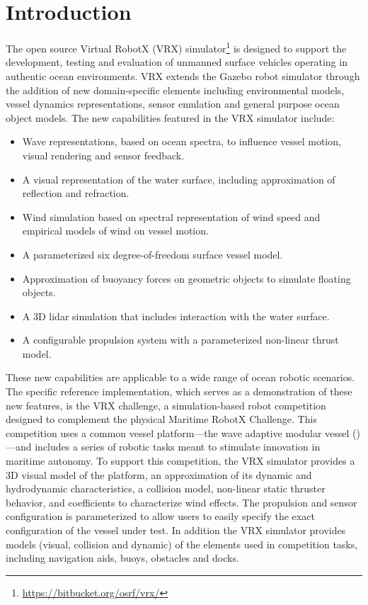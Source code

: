 \documentclass[utf8]{frontiersSCNS} %
\begin{document}
\section{Introduction}
The open source Virtual RobotX (VRX) simulator\footnote{\url{https://bitbucket.org/osrf/vrx/}} is designed to support the development, testing and evaluation of unmanned surface vehicles operating in authentic ocean environments.  VRX extends the Gazebo robot simulator through the addition of new domain-specific elements including environmental models, vessel dynamics representations, sensor emulation and general purpose ocean object models.  The new capabilities featured in the VRX simulator include:
\begin{itemize}
\item Wave representations, based on ocean spectra, to influence vessel motion, visual rendering and sensor feedback.
\item A visual representation of the water surface, including approximation of reflection and refraction.
\item Wind simulation based on spectral representation of wind speed and empirical models of wind on vessel motion.
\item A parameterized six degree-of-freedom surface vessel model.
\item Approximation of buoyancy forces on geometric objects to simulate floating objects.
\item A 3D lidar simulation that includes interaction with the water surface.
\item A configurable propulsion system with a parameterized non-linear thrust model.
\end{itemize}

These new capabilities are applicable to a wide range of ocean robotic scenarios.  The specific reference implementation, which serves as a demonstration of these new features, is the VRX challenge, a simulation-based robot competition designed to complement the physical Maritime RobotX Challenge.  This competition uses a common vessel platform---the wave adaptive modular vessel (\wamv{})---and includes a series of robotic tasks meant to stimulate innovation in maritime autonomy.  To support this competition, the VRX simulator provides a 3D visual model of the \wamv{} platform, an approximation of its dynamic and hydrodynamic characteristics, a collision model, non-linear static thruster behavior, and coefficients to characterize wind effects.   The propulsion and sensor configuration is parameterized to allow users to easily specify the exact configuration of the vessel under test.  In addition the VRX simulator provides models (visual, collision and dynamic) of the elements used in competition tasks, including navigation aids, buoys, obstacles and docks.  
\end{document}

